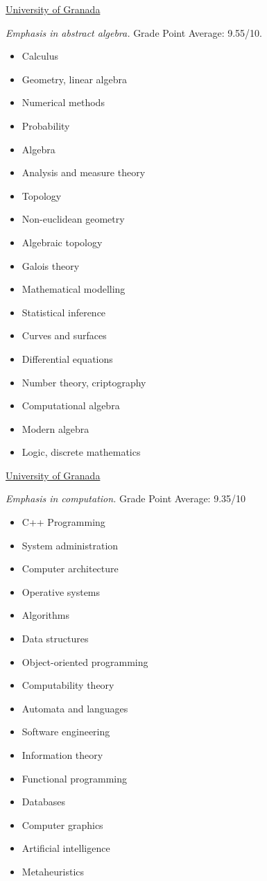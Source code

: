 \documentclass[nocolors]{friggeri-cv-a4}
\begin{document}
\begin{entrylist}
  
{\href{http://www.ugr.es/en/}{University of Granada}}
{\emph{Emphasis in abstract algebra.} Grade Point Average: 9.55/10.
  {\scriptsize
  \begin{multicols}{2}
    \begin{itemize}[topsep=0pt]
    \item Calculus
    \item Geometry, linear algebra
    \item Numerical methods
    \item Probability
    \item Algebra
    \item Analysis and measure theory
    \item Topology
    \item Non-euclidean geometry
    \item Algebraic topology
    \item Galois theory
    \item Mathematical modelling
    \item Statistical inference
    \item Curves and surfaces
    \item Differential equations
    \item Number theory, criptography
    \item Computational algebra
    \item Modern algebra
    \item Logic, discrete mathematics
    \end{itemize}
  \end{multicols}
  }
}

{\href{http://www.ugr.es/en/}{University of Granada}}
{\emph{Emphasis in computation.} Grade Point Average: 9.35/10
  {\scriptsize
    \begin{multicols}{2}
    \begin{itemize}[topsep=0pt]
    \item C++ Programming
    \item System administration
    \item Computer architecture
    \item Operative systems
    \item Algorithms
    \item Data structures
    \item Object-oriented programming
    \item Computability theory
    \item Automata and languages
    \item Software engineering
    \item Information theory
    \item Functional programming
    \item Databases
    \item Computer graphics
    \item Artificial intelligence
    \item Metaheuristics
    \end{itemize}
  \end{multicols}
  }
  
}
\end{entrylist}
\end{document}
